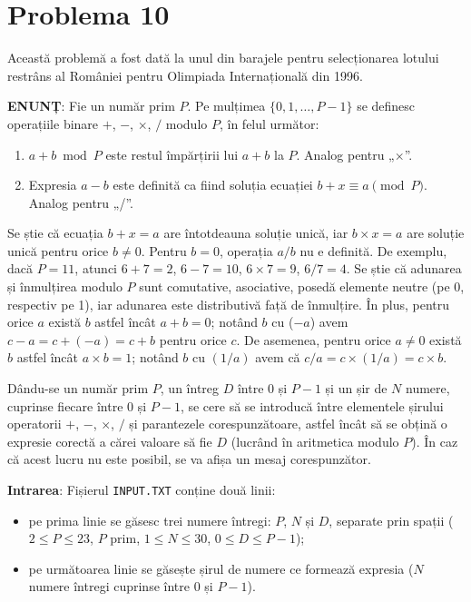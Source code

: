 \section{Problema 10}

Această problemă a fost dată la unul din barajele pentru selecționarea lotului
restrâns al României pentru Olimpiada Internațională din 1996.

{\bf ENUNȚ}: Fie un număr prim $P$. Pe mulțimea $\{0, 1, \dots, P-1\}$ se
definesc operațiile binare $+$, $-$, $\times$, $/$ modulo $P$, în felul
următor:

\begin{enumerate}

\item $a + b \bmod P$ este restul împărțirii lui $a+b$ la $P$. Analog pentru
  „$\times$”.

\item Expresia $a-b$ este definită ca fiind soluția ecuației $b+x \equiv a
  \pmod{P}$. Analog pentru „/”.

\end{enumerate}

Se știe că ecuația $b + x = a$ are întotdeauna soluție unică, iar $b \times x
= a$ are soluție unică pentru orice $b \neq 0$. Pentru $b = 0$, operația $a/b$
nu e definită. De exemplu, dacă $P=11$, atunci $6+7=2$, $6-7=10$, $6 \times
7=9$, $6/7=4$. Se știe că adunarea și înmulțirea modulo $P$ sunt comutative,
asociative, posedă elemente neutre (pe 0, respectiv pe 1), iar adunarea este
distributivă față de înmulțire. În plus, pentru orice $a$ există $b$ astfel
încât $a+b=0$; notând $b$ cu ($-a$) avem $c-a=c+(-a)=c+b$ pentru orice $c$. De
asemenea, pentru orice $a \neq 0$ există $b$ astfel încât $a \times b = 1$;
notând $b$ cu $(1/a)$ avem că $c/a=c \times (1/a)=c \times b$.

Dându-se un număr prim $P$, un întreg $D$ între 0 și $P-1$ și un șir de $N$
numere, cuprinse fiecare între 0 și $P-1$, se cere să se introducă între
elementele șirului operatorii $+$, $-$, $\times$, $/$ și parantezele
corespunzătoare, astfel încât să se obțină o expresie corectă a cărei valoare
să fie $D$ (lucrând în aritmetica modulo $P$). În caz că acest lucru nu este
posibil, se va afișa un mesaj corespunzător.

{\bf Intrarea}: Fișierul {\tt INPUT.TXT} conține două linii:

\begin{itemize}

\item pe prima linie se găsesc trei numere întregi: $P$, $N$ și $D$, separate
  prin spații ($2 \leq P \leq 23$, $P$ prim, $1 \leq N \leq 30$, $0 \leq D
  \leq P-1$);

\item pe următoarea linie se găsește șirul de numere ce formează expresia ($N$
  numere întregi cuprinse între 0 și $P-1$).

\end{itemize}

